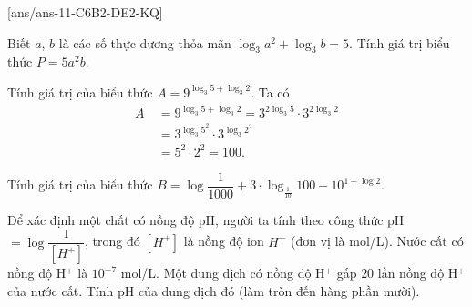 [ans/ans-11-C6B2-DE2-KQ]
\caukq
\begin{ex}%
	Biết $a$, $b$ là các số thực dương thỏa mãn $\log_3 a^2+\log_3 b=5$. Tính giá trị biểu thức $P=5a^2b$.
\end{ex}
\begin{ex}%
	Tính giá trị của biểu thức $A=9^{\log_3 5 +\log_3 2}$.
	\loigiai
	{Ta có \begin{align*}
			A&\ =9^{\log_3 5 +\log_3 2}=3^{2\log_3 5}\cdot 3^{2\log_3 2}\\
			&\ =3^{\log_3 5^2}\cdot 3^{\log_3 2^2}\\
			&\ =5^2\cdot 2^2 =100.
	\end{align*}}
\end{ex}
\begin{ex}%
	Tính giá trị của biểu thức
	$B=\log\dfrac{1}{1000}+3\cdot \log_{\frac{1}{10}}100-10^{1+\log 2}$.
\end{ex}
\begin{ex}%
	Để xác định một chất có nồng độ pH, người ta tính theo công thức pH$=\log\dfrac{1}{\left[H^+\right]}$, trong đó $\left[H^+\right]$ là nồng độ ion $H^+$ (đơn vị là  mol/L).
	Nước cất có nồng độ  H$^+ $ là $ 10^{-7} $ mol/L. Một dung dịch có nồng độ  H$^+ $ gấp $ 20 $ lần nồng độ  H$^+ $ của nước cất. Tính pH của dung dịch đó (làm tròn đến hàng phần mười). 
\end{ex}

